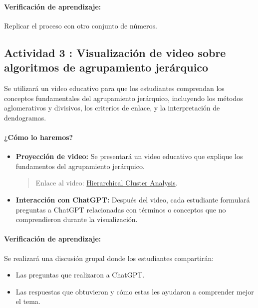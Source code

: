 \documentclass[a4,11pt]{aleph-notas}
\begin{document}
\paragraph{Verificación de aprendizaje:}  
Replicar el proceso con otro conjunto de números.

\subsection*{Actividad 3 : Visualización de video sobre algoritmos de agrupamiento jerárquico}

Se utilizará un video educativo para que los estudiantes comprendan los conceptos fundamentales del agrupamiento jerárquico, incluyendo los métodos aglomerativos y divisivos, los criterios de enlace, y la interpretación de dendogramas.

\paragraph{¿Cómo lo haremos?}  
\begin{itemize}[leftmargin=*]
    \item \textbf{Proyección de video:}  
    Se presentará un video educativo que explique los fundamentos del agrupamiento jerárquico.
    \begin{quote}
        Enlace al video: \href{https://youtu.be/8QCBl-xdeZI?si=TYfeBv0pZGRS_0zS}{Hierarchical Cluster Analysis}.
    \end{quote}
    \item \textbf{Interacción con ChatGPT:}  
    Después del video, cada estudiante formulará preguntas a ChatGPT relacionadas con términos o conceptos que no comprendieron durante la visualización.
\end{itemize}

\paragraph{Verificación de aprendizaje:}  
Se realizará una discusión grupal donde los estudiantes compartirán:
\begin{itemize}[leftmargin=*]
    \item Las preguntas que realizaron a ChatGPT.
    \item Las respuestas que obtuvieron y cómo estas les ayudaron a comprender mejor el tema.
\end{itemize}

\end{document}
